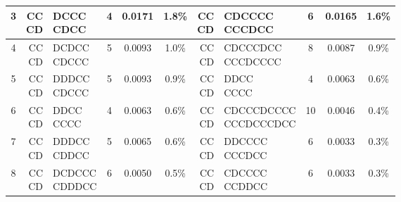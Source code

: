 \documentclass[9pt,twoside,lineno]{pnas-new}
\theoremstyle{plainCl1}
\theoremstyle{plainCl2}
\begin{document}
\begin{table}[t]
{\begin{tabular}{c|rlccc|rlccc}
    3  &  \cellcolor{gray!25} \makecell[r]{CC \\ CD} & \makecell[l]{   DCCC \\     CDCC} &  4 &  0.0171 & 1.8\%  &   \cellcolor{gray!25} \makecell[r]{CC \\ CD} & \makecell[l]{       CDCCCC \\        CCCDCC} &   6 &   0.0165 & 1.6\% \\ \hline
    4  &  \cellcolor{gray!25} \makecell[r]{CC \\ CD} & \makecell[l]{  DCDCC \\    CDCCC} &  5 &  0.0093 & 1.0\%  &   \cellcolor{gray!25} \makecell[r]{CC \\ CD} & \makecell[l]{     CDCCCDCC \\      CCCDCCCC} &   8 &   0.0087 & 0.9\% \\ \hline
    5  &  \cellcolor{gray!25} \makecell[r]{CC \\ CD} & \makecell[l]{  DDDCC \\    CDCCC} &  5 &  0.0093 & 0.9\%  &   \cellcolor{gray!25} \makecell[r]{CC \\ CD} & \makecell[l]{         DDCC \\          CCCC} &   4 &   0.0063 & 0.6\% \\ \hline
    6  &  \cellcolor{gray!25} \makecell[r]{CC \\ CD} & \makecell[l]{   DDCC \\     CCCC} &  4 &  0.0063 & 0.6\%  &   \cellcolor{gray!25} \makecell[r]{CC \\ CD} & \makecell[l]{   CDCCCDCCCC \\    CCCDCCCDCC} &  10 &   0.0046 & 0.4\% \\ \hline
    7  &  \cellcolor{gray!25} \makecell[r]{CC \\ CD} & \makecell[l]{  DDDCC \\    CDDCC} &  5 &  0.0065 & 0.6\%  &   \cellcolor{gray!25} \makecell[r]{CC \\ CD} & \makecell[l]{       DDCCCC \\        CCCDCC} &   6 &   0.0033 & 0.3\% \\ \hline
    8  &  \cellcolor{gray!25} \makecell[r]{CC \\ CD} & \makecell[l]{ DCDCCC \\   CDDDCC} &  6 &  0.0050 & 0.5\%  &   \cellcolor{gray!25} \makecell[r]{CC \\ CD} & \makecell[l]{       CDCCCC \\        CCDDCC} &   6 &   0.0033 & 0.3\% \\ \hline

\end{tabular}}
\end{table}
\end{document}
